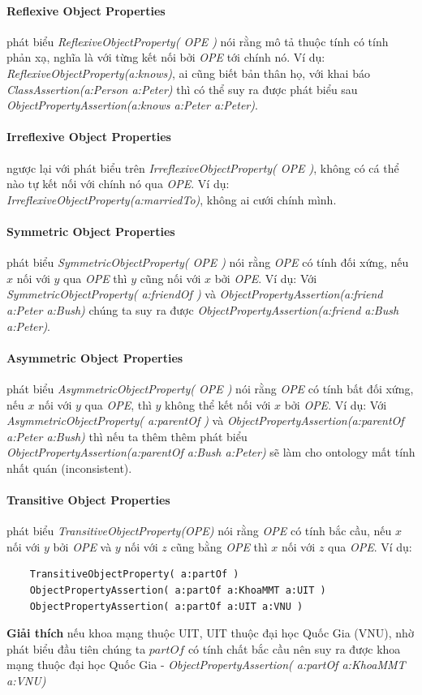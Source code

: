 \paragraph{Reflexive Object Properties} phát biểu \textit{ReflexiveObjectProperty( OPE )} nói rằng mô tả thuộc tính có tính phản xạ, nghĩa là với từng kết nối bởi \textit{OPE} tới chính nó. Ví dụ: \textit{ReflexiveObjectProperty(a:knows)}, ai cũng biết bản thân họ, với khai báo \textit{ClassAssertion(a:Person a:Peter)} thì có thể suy ra được phát biểu sau \textit{ObjectPropertyAssertion(a:knows a:Peter a:Peter)}.

\paragraph{Irreflexive Object Properties} ngược lại với phát biểu trên  \textit{IrreflexiveObjectProperty( OPE )}, không có cá thể nào tự kết nối với chính nó qua \textit{OPE}. Ví dụ: \textit{IrreflexiveObjectProperty(a:marriedTo)}, không ai cưới chính mình.

\paragraph{Symmetric Object Properties} phát biểu \textit{SymmetricObjectProperty( OPE )} nói rằng \textit{OPE} có tính đối xứng, nếu $x$ nối với $y$ qua \textit{OPE} thì $y$ cũng nối với $x$ bởi \textit{OPE}. Ví dụ: Với\textit{ SymmetricObjectProperty( a:friendOf )} và \textit{ObjectPropertyAssertion(a:friend a:Peter a:Bush)} chúng ta suy ra được \textit{ObjectPropertyAssertion(a:friend a:Bush a:Peter)}.


\paragraph{Asymmetric Object Properties} phát biểu \textit{AsymmetricObjectProperty( OPE )} nói rằng \textit{OPE} có tính bất đối xứng, nếu $x$ nối với $y$ qua \textit{OPE}, thì $y$ không thể kết nối với $x$ bởi \textit{OPE}. Ví dụ: Với \textit{AsymmetricObjectProperty( a:parentOf )}  và \textit{ObjectPropertyAssertion(a:parentOf a:Peter a:Bush)} thì nếu ta thêm thêm phát biểu \textit{ObjectPropertyAssertion(a:parentOf a:Bush a:Peter)} sẽ làm cho ontology mất tính nhất quán (inconsistent).


\paragraph{Transitive Object Properties} phát biểu \textit{TransitiveObjectProperty(OPE)} nói rằng \textit{OPE} có tính bắc cầu, nếu $x$ nối với $y$ bởi \textit{OPE} và $y$ nối với $z$ cũng bằng \textit{OPE} thì $x$ nối với $z$ qua \textit{OPE}. Ví dụ:
\begin{verbatim}
	TransitiveObjectProperty( a:partOf ) 
	ObjectPropertyAssertion( a:partOf a:KhoaMMT a:UIT )
	ObjectPropertyAssertion( a:partOf a:UIT a:VNU )
\end{verbatim}
\textbf{Giải thích} nếu khoa mạng thuộc UIT, UIT thuộc đại học Quốc Gia (VNU), nhờ phát biểu đầu tiên chúng ta $partOf$ có tính chất bắc cầu nên suy ra được khoa mạng thuộc đại học Quốc Gia - \textit{ObjectPropertyAssertion( a:partOf a:KhoaMMT a:VNU)}


